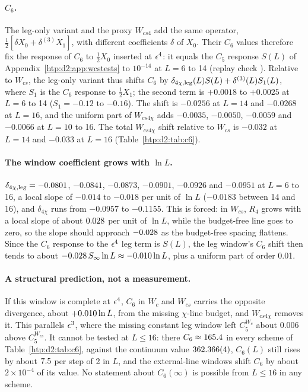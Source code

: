 \paragraph{$C_6$.} The leg-only variant and the proxy $W_{cs4}$ add the same operator, $\frac12[\delta X_0+\delta^{(3)}X_1]$,
with different coefficients $\delta$ of $X_0$. Their $C_6$ values therefore fix the response of $C_6$ to $\frac12X_0$
inserted at $\epsilon^4$: it equals the $C_5$ response $S(L)$ of Appendix~\ref{htp:d2:app:wcstests} to $10^{-14}$ at $L=6$ to 14
(replay check ). Relative to $W_{cs}$, the leg-only variant thus shifts $C_6$ by
$\delta_{4\chi,{\rm leg}}(L)S(L)+\delta^{(3)}(L)S_1(L)$, where $S_1$ is the $C_6$ response to $\frac12X_1$; the second term is
$+0.0018$ to $+0.0025$ at $L=6$ to 14 ($S_1=-0.12$ to $-0.16$). The shift is $-0.0256$ at $L=14$ and $-0.0268$ at $L=16$,
and the uniform part of $W_{cs4\chi}$ adds $-0.0035$, $-0.0050$, $-0.0059$ and $-0.0066$ at $L=10$ to 16. The total
$W_{cs4\chi}$ shift relative to $W_{cs}$ is $-0.032$ at $L=14$ and $-0.033$ at $L=16$ (Table~\ref{htp:d2:tab:c6}).

\paragraph{The window coefficient grows with $\ln L$.} $\delta_{4\chi,{\rm leg}}=-0.0801$, $-0.0841$, $-0.0873$, $-0.0901$, $-0.0926$ and $-0.0951$ at
$L=6$ to 16, a local slope of $-0.014$ to $-0.018$ per unit of $\ln L$ ($-0.0183$ between 14 and 16), and $\delta_{4\chi}$ runs
from $-0.0957$ to $-0.1155$. This is forced: in $W_{cs}$, $R_4$ grows with a local slope of about $0.028$ per unit of $\ln L$, while the
budget-free line goes to zero, so the slope should approach $-0.028$ as the budget-free spacing flattens. Since
the $C_6$ response to the $\epsilon^4$ leg term is $S(L)$, the leg window's $C_6$ shift then tends to about
$-0.028\,S_\infty\ln L\approx-0.010\ln L$, plus a uniform part of order 0.01.

\paragraph{A structural prediction, not a measurement.} If this window is complete at $\epsilon^4$, $C_6$ in $W_c$ and $W_{cs}$
carries the opposite divergence, about $+0.010\ln L$, from the missing $\chi$-line budget, and $W_{cs4\chi}$ removes it.
This parallels $\epsilon^3$, where the missing constant leg window left $C_5^{W_c}$ about $0.006$ above $C_5^{W_{cs}}$. It cannot be
tested at $L\le16$: there $C_6\approx165.4$ in every scheme of Table~\ref{htp:d2:tab:c6}, against the continuum value
$362.366(4)$, $C_6(L)$ still rises by about $7.5$ per step of 2 in $L$, and the external-line windows shift $C_6$
by about $2\times10^{-4}$ of its value. No statement
about $C_6(\infty)$ is possible from $L\le16$ in any scheme.

